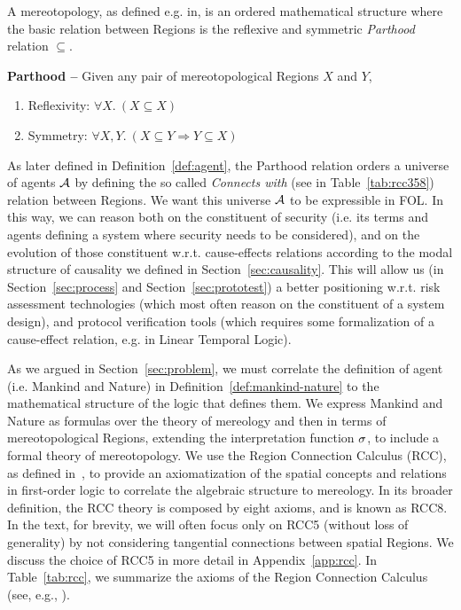 A mereotopology, as defined e.g. in\autocite{Rachavelpula2017mereotopology},
is an ordered mathematical structure where the basic relation between Regions is the
reflexive and symmetric 
\emph{Parthood} relation $\subseteq$. 
\begin{definition}{\bf Parthood --}\label{def:parthood}
Given any pair of mereotopological Regions $X$ and $Y$,
	\begin{enumerate}[noitemsep]
		\item Reflexivity: $\forall X.~ (X\subseteq X)$
		\item Symmetry: $\forall X, Y.~ (X\subseteq Y \Rightarrow Y\subseteq X)$
	\end{enumerate}
\end{definition}

As later defined in Definition~\ref{def:agent}, 
the Parthood relation orders a universe of agents $\mathcal{A}$ by defining
the so called \emph{Connects with} (see in Table~\ref{tab:rcc358}) relation 
between Regions. We want this universe $\mathcal{A}$ to be 
expressible in FOL. In this way, we
can reason both on the constituent of security (i.e. its terms and agents
defining a system where security needs to be considered), and on 
the evolution of those constituent w.r.t. cause-effects relations according
to the modal structure of causality we defined in Section~\ref{sec:causality}.
This will allow us (in Section~\ref{sec:process} and Section~\ref{sec:prototest})
a better 
positioning w.r.t. risk assessment technologies
(which most often reason on the constituent of a system design), and
protocol verification tools (which requires some formalization of a cause-effect relation, e.g.
in Linear Temporal Logic).

As we argued in Section~\ref{sec:problem}, we must correlate the definition of
agent (i.e. Mankind and Nature) in Definition~\ref{def:mankind-nature} to the
mathematical structure of the logic that defines them.  We express Mankind and
Nature as formulas over the theory of mereology and then in terms of
mereotopological Regions, extending the interpretation function
$\sigma$, to include a formal theory of mereotopology.  We use the
Region Connection Calculus (RCC), as defined
in~\cite{bennettLogics,improvingRCC}, to provide an axiomatization of the
spatial concepts and relations in first-order logic to correlate the algebraic
structure to mereology. In its broader definition, the RCC theory is composed
by eight axioms, and is known as RCC8. In the text, for brevity, 
we will often focus only on RCC5 (without
loss of generality) by not considering tangential connections between spatial
Regions. We discuss the choice of RCC5 in more detail in
Appendix~\ref{app:rcc}. In Table~\ref{tab:rcc}, we
summarize the axioms of the Region Connection Calculus (see, e.g., \autocite{Grutter2008rcc}).

